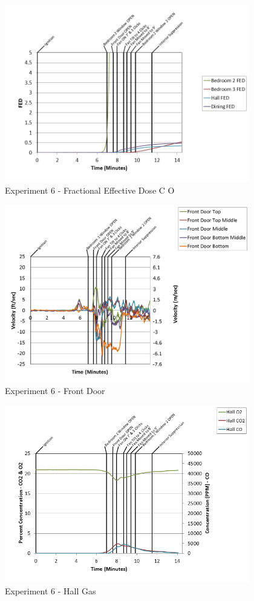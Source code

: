 \documentclass{article}
\begin{document}
\begin{appendices}
\clearpage

\begin{figure}[h!]
	\centering
	\includegraphics[height=3.05in]{0_Images/Results_Charts/Exp_6_Charts/FractionalEffectiveDoseCO.png}
	\caption{Experiment 6 - Fractional Effective Dose C O}
\end{figure}


\begin{figure}[h!]
	\centering
	\includegraphics[height=3.05in]{0_Images/Results_Charts/Exp_6_Charts/FrontDoor.png}
	\caption{Experiment 6 - Front Door}
\end{figure}

\clearpage

\begin{figure}[h!]
	\centering
	\includegraphics[height=3.05in]{0_Images/Results_Charts/Exp_6_Charts/HallGas.png}
	\caption{Experiment 6 - Hall Gas}
\end{figure}



\end{appendices}
\end{document}
